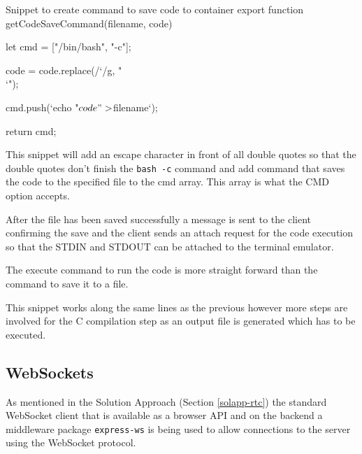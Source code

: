 \begin{sexylisting}{Snippet to create command to save code to container}
export function getCodeSaveCommand(filename, code) {
    let cmd = ["/bin/bash", "-c"];

    code = code.replace(/`/g, "\\`");

    cmd.push(`echo "${code}" > ${filename}`);

    return cmd;
}
\end{sexylisting}

This snippet will add an escape character in front of all double quotes so that the double quotes don't finish the \texttt{bash -c} command and add command that saves the code to the specified file to the cmd array. This array is what the CMD option accepts. 

After the file has been saved successfully a message is sent to the client confirming the save and the client sends an attach request for the code execution so that the STDIN and STDOUT can be attached to the terminal emulator.

The execute command to run the code is more straight forward than the command to save it to a file.


This snippet works along the same lines as the previous however more steps are involved for the C compilation step as an output file is generated which has to be executed.

\subsection{WebSockets}

As mentioned in the Solution Approach (Section \ref{solapp-rtc}) the standard WebSocket client that is available as a browser API and on the backend a middleware package \texttt{express-ws} \cite{expressws} is being used to allow connections to the server using the WebSocket protocol.

